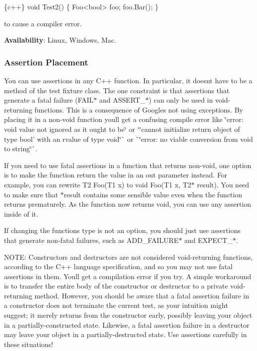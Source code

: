 \begin{DoxyCode}
\{c++\}
void Test2() \{ Foo<bool> foo; foo.Bar(); \}
\end{DoxyCode}


to cause a compiler error.

{\bfseries Availability}\+: Linux, Windows, Mac.

\subsubsection*{Assertion Placement}

You can use assertions in any C++ function. In particular, it doesn\textquotesingle{}t have to be a method of the test fixture class. The one constraint is that assertions that generate a fatal failure ({\ttfamily F\+A\+I\+L$\ast$} and {\ttfamily A\+S\+S\+E\+R\+T\+\_\+$\ast$}) can only be used in void-\/returning functions. This is a consequence of Google\textquotesingle{}s not using exceptions. By placing it in a non-\/void function you\textquotesingle{}ll get a confusing compile error like {\ttfamily \char`\"{}error\+: void value not ignored as it ought to be\char`\"{}} or `\char`\"{}cannot
initialize return object of type \textquotesingle{}bool' with an rvalue of type \textquotesingle{}void\textquotesingle{}\char`\"{}\`{} or \`{}\char`\"{}error\+: no viable conversion from \textquotesingle{}void\textquotesingle{} to \textquotesingle{}string\textquotesingle{}\char`\"{}\`{}.

If you need to use fatal assertions in a function that returns non-\/void, one option is to make the function return the value in an out parameter instead. For example, you can rewrite {\ttfamily T2 Foo(\+T1 x)} to {\ttfamily void Foo(\+T1 x, T2$\ast$ result)}. You need to make sure that {\ttfamily $\ast$result} contains some sensible value even when the function returns prematurely. As the function now returns {\ttfamily void}, you can use any assertion inside of it.

If changing the function\textquotesingle{}s type is not an option, you should just use assertions that generate non-\/fatal failures, such as {\ttfamily A\+D\+D\+\_\+\+F\+A\+I\+L\+U\+R\+E$\ast$} and {\ttfamily E\+X\+P\+E\+C\+T\+\_\+$\ast$}.

N\+O\+TE\+: Constructors and destructors are not considered void-\/returning functions, according to the C++ language specification, and so you may not use fatal assertions in them. You\textquotesingle{}ll get a compilation error if you try. A simple workaround is to transfer the entire body of the constructor or destructor to a private void-\/returning method. However, you should be aware that a fatal assertion failure in a constructor does not terminate the current test, as your intuition might suggest; it merely returns from the constructor early, possibly leaving your object in a partially-\/constructed state. Likewise, a fatal assertion failure in a destructor may leave your object in a partially-\/destructed state. Use assertions carefully in these situations!

